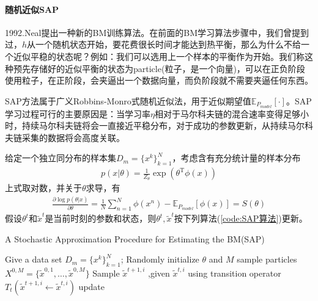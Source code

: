 {            \paragraph{随机近似SAP}1992.Neal\cite{1992.Neal}提出一种新的BM训练算法。在前面的BM学习算法步骤中，我们曾提到过，$h$从一个随机状态开始，要花费很长时间才能达到热平衡，那么为什么不给一个近似平稳的状态呢？例如：我们可以选用上一个样本的平衡作为开始。我们称这种预先存储好的近似平衡的状态为particle(粒子，是一个向量)，可以在正负阶段使用粒子，在正阶段，会夹逼出一个数据向量，而负阶段就不需要夹逼任何东西。
            \par
            SAP方法属于广义Robbins-Monro式随机近似法，用于近似期望值$\mathbb{E}_{P_{model}}[\cdot]$。SAP学习过程可行的主要原因是：当学习率$\eta$相对于马尔科夫链的混合速率变得足够小时，持续马尔科夫链将会一直接近平稳分布，对于成功的参数更新，从持续马尔科夫链采集的数据将会高度关联。
            \par
            给定一个独立同分布的样本集$D_m = \{x^k\}_{k=1}^N$，考虑含有充分统计量的样本分布
            \begin{align*}
            p(x|\theta) = \frac{1}{Z_\theta} \exp(\theta^\mathrm{T}\phi(x))
            \end{align*}
            上式取对数，并关于$\theta$求导，有
            \begin{align*}
            \frac{\partial \log p(\theta|x)}{\partial \theta} = \frac{1}{N}\sum_{n=1}^N\phi(x^n) - \mathbb{E}_{P_{model}}[\phi(x)] = S(\theta)
            \end{align*}
            假设$\theta^t$和$\tilde{x}^t$是当前时刻的参数和状态，则$\theta^t,\tilde{ x}^t$按下列算法(\ref{code:SAP算法})更新。
             \begin{algorithm}[h]
                \caption{A Stochastic Approximation Procedure for Estimating the BM(SAP)}\label{code:SAP算法}
                \begin{algorithmic}[1]
                    \State Give a data set $D_m = \{x^k\}_{k=1}^N$; Randomly initialize $\theta$ and $M$ sample particles $X^{0,M}=\{\tilde{ x}^{0,1},\dots,\tilde{x}^{0,M}\}$
                            \State Sample $\tilde{ x}^{t+1,i}$ ,given $\tilde{x}^{t,i}$ using transition operator $T_t(\tilde{ x}^{t+1,i} \leftarrow \tilde{ x}^{t,i})$
                        \EndFor
                        \State update
                        \begin{align*}

\end{align*}
\end{algorithmic}
\end{algorithm}}
